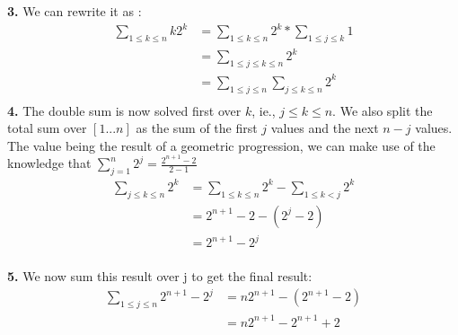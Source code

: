 \documentclass[12pt]{article}
\begin{document}
{\bf 3.} We can rewrite it as : \begin{equation}\label{eq1}
                                  \begin{split}
                                     \sum\limits_{1\leq k\leq n} k2^k & = \sum\limits_{1\leq k\leq n} 2^k * \sum\limits_{1\leq j\leq k} 1 \\
                                       & =\sum\limits_{1\leq j\leq k\leq n} 2^k \\
                                       & =\sum\limits_{1\leq j\leq n} \sum\limits_{j\leq k\leq n} 2^k \\
                                  \end{split}
                                \end{equation}
\medskip
{\bf 4.} The double sum is now solved first over $k$, ie., $j\leq k\leq n$. We also split the total sum over $[1...n]$ as the sum of the first $j$ values and the next $n-j$ values. The value being the result of a geometric progression, we can make use of the knowledge that $\sum\limits_{j=1}^{n} 2^j = \frac{2^{n+1} - 2}{2-1}$
\begin{equation}\label{eq1}
                                  \begin{split}
                                     \sum\limits_{j\leq k\leq n} 2^k & = \sum\limits_{1\leq k\leq n} 2^k - \sum\limits_{1\leq k< j} 2^k \\
                                       & =2^{n+1} - 2 - (2^{j} - 2) \\
                                       & =2^{n+1} - 2^j \\
                                  \end{split}
                                \end{equation}

{\bf 5.} We now sum this result over j to get the final result: \begin{equation}\label{eq1}
                                  \begin{split}
                                     \sum\limits_{1\leq j\leq n} 2^{n+1} - 2^j & = n2^{n+1} - (2^{n+1} -2) \\
                                       & = n2^{n+1} - 2^{n+1} + 2\\
                                  \end{split}
                                \end{equation}

\medskip
\end{document}
